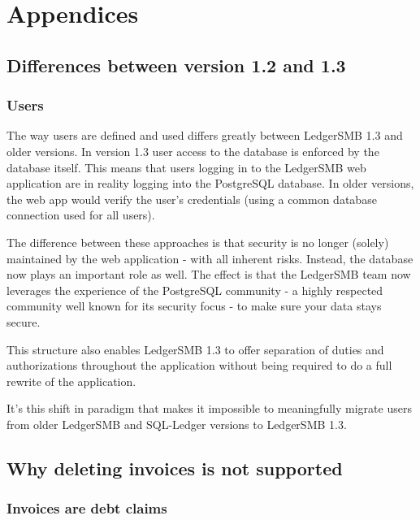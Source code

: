 
\part{Appendices}
\label{part-appendices}

\appendix

\chapter{Differences between version 1.2 and 1.3}
\label{app-differences-12-13}

\section{Users}
\label{sec-diff12-13-users}

The way users are defined and used differs greatly between LedgerSMB 1.3 and
older versions. In version 1.3 user access to the database is enforced by the
database itself. This means that users logging in to the LedgerSMB web application
are in reality logging into the PostgreSQL database. In older versions, the web
app would verify the user's credentials (using a common database connection used
for all users).

The difference between these approaches is that security is no longer (solely)
maintained by the web application - with all inherent risks. Instead, the database
now plays an important role as well. The effect is that the LedgerSMB team now
leverages the experience of the PostgreSQL community - a highly respected community
well known for its security focus - to make sure your data stays secure.

This structure also enables LedgerSMB 1.3 to offer separation of duties and
authorizations throughout the application without being required to do a full
rewrite of the application.

It's this shift in paradigm that makes it impossible to meaningfully migrate
users from older LedgerSMB and SQL-Ledger versions to LedgerSMB 1.3.


\chapter{Why deleting invoices is not supported}
\label{app-no-invoice-deletion}

\section{Invoices are debt claims}
\label{sec-no-invoices-deletion-claims}


